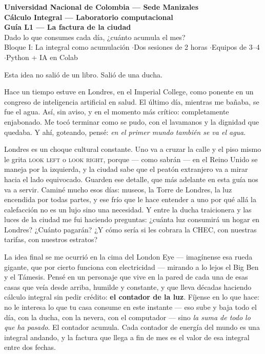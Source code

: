 \documentclass[12pt,letterpaper]{article}
\begin{document}
\begin{center}
    {\Large \textbf{Universidad Nacional de Colombia --- Sede Manizales}}\\
    {\large \textbf{Cálculo Integral --- Laboratorio computacional}}\\[0.8em]
    {\LARGE \textbf{Guía L1 --- La factura de la ciudad}}\\[0.4em]
    {\large Dado lo que consumes cada día, ¿cuánto acumula el mes?}\\[0.5em]
    {\normalsize Bloque I: La integral como acumulación \quad$\cdot$\quad Dos sesiones de 2 horas \quad$\cdot$\quad Equipos de 3--4 \quad$\cdot$\quad Python + IA en Colab}
\end{center}

\begin{cajabitacora}
Esta idea no salió de un libro. Salió de una ducha.

Hace un tiempo estuve en Londres, en el Imperial College, como ponente en un congreso de inteligencia artificial en salud. El último día, mientras me bañaba, se fue el agua. Así, sin aviso, y en el momento más crítico: completamente enjabonado. Me tocó terminar como se pudo, con el lavamanos y la dignidad que quedaba. Y ahí, goteando, pensé: \emph{en el primer mundo también se va el agua}.

Londres es un choque cultural constante. Uno va a cruzar la calle y el piso mismo le grita \textsc{look left} o \textsc{look right}, porque --- como sabrán --- en el Reino Unido se maneja por la izquierda, y la ciudad sabe que el peatón extranjero va a mirar hacia el lado equivocado. Guarden ese detalle, que más adelante en esta guía nos va a servir. Caminé mucho esos días: museos, la Torre de Londres, la luz encendida por todas partes, y ese frío que le hace entender a uno por qué allá la calefacción no es un lujo sino una necesidad. Y entre la ducha traicionera y las luces de la ciudad me fui haciendo preguntas: ¿cuánta luz consumirá un hogar en Londres? ¿Cuánto pagarán? ¿Y cómo sería si les cobrara la CHEC, con nuestras tarifas, con nuestros estratos?

La idea final se me ocurrió en la cima del London Eye --- imagínense esa rueda gigante, que por cierto funciona con electricidad --- mirando a lo lejos el Big Ben y el Támesis. Pensé en un personaje que vive en la pared de cada una de esas casas que veía desde arriba, humilde y constante, y que lleva décadas haciendo cálculo integral sin pedir crédito: \textbf{el contador de la luz}. Fíjense en lo que hace: no le interesa lo que tu casa consume en este instante --- eso sube y baja todo el día, con la ducha, con la nevera, con el computador --- sino \emph{la suma de todo lo que ha pasado}. El contador acumula. Cada contador de energía del mundo es una integral andando, y la factura que llega a fin de mes es el valor de esa integral entre dos fechas.


\end{cajabitacora}
\end{document}
